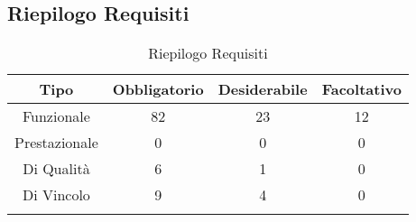 \subsection{Riepilogo Requisiti}
\normalsize
\begingroup
\renewcommand\arraystretch{2}
\begin{longtable}{|c|c|c|c|}
\hline 
\textbf{Tipo} & \textbf{Obbligatorio} & \textbf{Desiderabile} & \textbf{Facoltativo}\\
\hline
Funzionale & 82 & 23 & 12\\ \hline
Prestazionale & 0 & 0 & 0\\ \hline
Di Qualità & 6 & 1 & 0\\ \hline
Di Vincolo & 9 & 4  & 0\\ \hline
\caption[Riepilogo Requisiti]{Riepilogo Requisiti}
\label{tabella:riepilogorequi}
\end{longtable}
\endgroup
\clearpage

